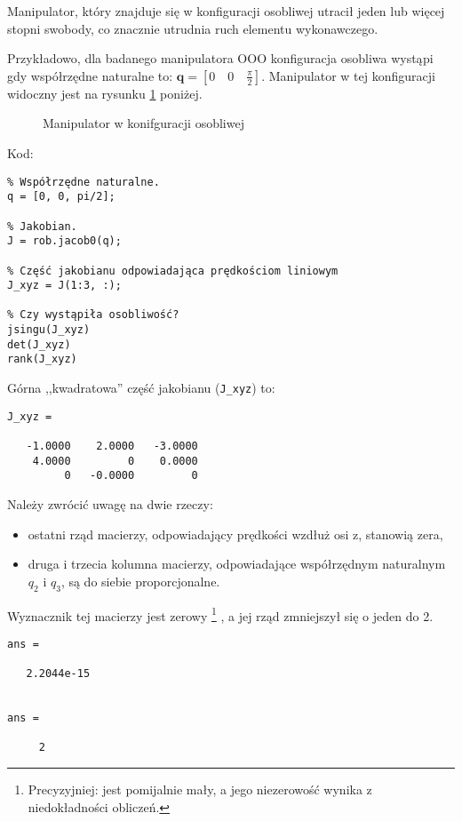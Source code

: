 \documentclass[11pt, a4paper]{article}
\begin{document}
Manipulator, który znajduje się w konfiguracji osobliwej utracił jeden lub więcej stopni swobody, co znacznie utrudnia ruch elementu wykonawczego.

Przykładowo, dla badanego manipulatora OOO konfiguracja osobliwa wystąpi gdy
współrzędne naturalne to: $\mathbf{q} = \left[0 \quad 0 \quad \frac{\pi}{2} \right]$.
Manipulator w tej konfiguracji widoczny jest na rysunku \ref{fig:sing} poniżej.
\begin{figure}[htbp!]
	\centering
	
	\hfill%
	
	\caption{Manipulator w konifguracji osobliwej \label{fig:sing}}
\end{figure}

Kod:
\begin{lstlisting}
% Współrzędne naturalne.
q = [0, 0, pi/2];

% Jakobian.
J = rob.jacob0(q);

% Część jakobianu odpowiadająca prędkościom liniowym
J_xyz = J(1:3, :);

% Czy wystąpiła osobliwość?
jsingu(J_xyz)
det(J_xyz)
rank(J_xyz)
\end{lstlisting}

Górna ,,kwadratowa'' część jakobianu (\texttt{J\_xyz}) to:
\begin{lstlisting}[numbers = none]
J_xyz =

   -1.0000    2.0000   -3.0000
    4.0000         0    0.0000
         0   -0.0000         0
\end{lstlisting}

Należy zwrócić uwagę na dwie rzeczy:
\begin{itemize}
\item ostatni rząd macierzy, odpowiadający prędkości wzdłuż osi z, stanowią zera,
\item druga i trzecia kolumna macierzy, odpowiadające współrzędnym naturalnym $q_2$ i $q_3$, są do siebie proporcjonalne.
\end{itemize}

Wyznacznik tej macierzy jest zerowy%
\footnote{Precyzyjniej: jest pomijalnie mały, a jego niezerowość wynika z niedokładności obliczeń.}%
, a jej rząd zmniejszył się o jeden do 2.
\begin{lstlisting}[numbers = none]
ans =

   2.2044e-15


ans =

     2
\end{lstlisting}
\end{document}
